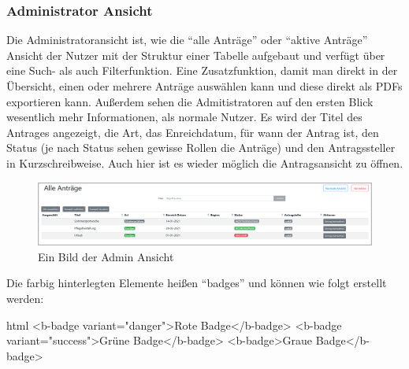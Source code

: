 \subsubsection{Administrator Ansicht}
\label{chapter:implementierung-frontend-komponenten-admin}
Die Administratoransicht ist, wie die \enquote{alle Anträge} oder \enquote{aktive Anträge} Ansicht der Nutzer mit der Struktur einer Tabelle aufgebaut und verfügt über eine Such- als auch Filterfunktion. Eine Zusatzfunktion, damit man direkt in der Übersicht, einen oder mehrere Anträge auswählen kann und diese direkt als PDFs exportieren kann. Außerdem sehen die Admitistratoren auf den ersten Blick wesentlich mehr Informationen, als normale Nutzer. Es wird der Titel des Antrages angezeigt, die Art, das Enreichdatum, für wann der Antrag ist, den Status (je nach Status sehen gewisse Rollen die Anträge) und den Antragssteller in Kurzschreibweise. Auch hier ist es wieder möglich die Antragsansicht zu öffnen.
\begin{figure}[H]
	\centering
	\includegraphics[width=1\linewidth]{images/website/admin}
	\caption[Aktiv]{Ein Bild der Admin Ansicht}
	\label{fig:adminview}
\end{figure}
Die farbig hinterlegten Elemente heißen \enquote{badges} und können wie folgt erstellt werden:
\begin{code}{html}
	<b-badge variant="danger">Rote Badge</b-badge>
	<b-badge variant="success">Grüne Badge</b-badge>
	<b-badge>Graue Badge</b-badge>
\end{code}
	\label{list:badgebsp} ~\\
~\\

\newpage
